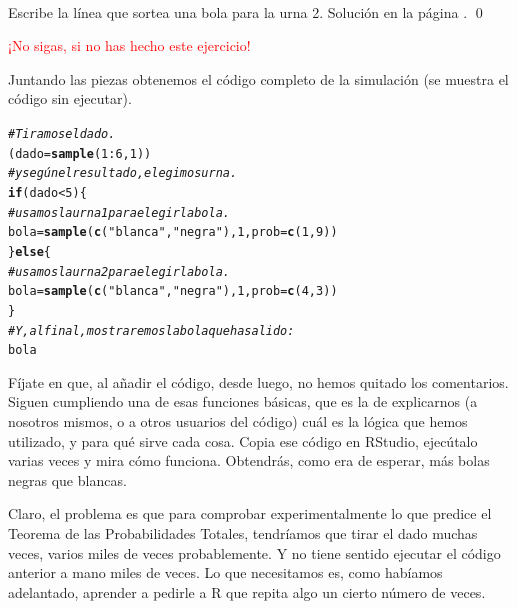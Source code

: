 \documentclass[10pt,a4paper]{article}\usepackage[]{graphicx}\usepackage[]{color}
\makeatletter
\newcommand{\hlnum}[1]{\textcolor[rgb]{0.686,0.059,0.569}{#1}}%
\newcommand{\hlstr}[1]{\textcolor[rgb]{0.192,0.494,0.8}{#1}}%
\newcommand{\hlcom}[1]{\textcolor[rgb]{0.678,0.584,0.686}{\textit{#1}}}%
\newcommand{\hlopt}[1]{\textcolor[rgb]{0,0,0}{#1}}%
\newcommand{\hlstd}[1]{\textcolor[rgb]{0.345,0.345,0.345}{#1}}%
\newcommand{\hlkwa}[1]{\textcolor[rgb]{0.161,0.373,0.58}{\textbf{#1}}}%
\newcommand{\hlkwb}[1]{\textcolor[rgb]{0.69,0.353,0.396}{#1}}%
\newcommand{\hlkwc}[1]{\textcolor[rgb]{0.333,0.667,0.333}{#1}}%
\newcommand{\hlkwd}[1]{\textcolor[rgb]{0.737,0.353,0.396}{\textbf{#1}}}%
\newenvironment{kframe}{%
 \def\at@end@of@kframe{}%
 \ifinner\ifhmode%
  \def\at@end@of@kframe{\end{minipage}}%
  \begin{minipage}{\columnwidth}%
 \fi\fi%
 \def\FrameCommand##1{\hskip\@totalleftmargin \hskip-\fboxsep
 \colorbox{shadecolor}{##1}\hskip-\fboxsep
     \hskip-\linewidth \hskip-\@totalleftmargin \hskip\columnwidth}%
 \MakeFramed {\advance\hsize-\width
   \@totalleftmargin\z@ \linewidth\hsize
   \@setminipage}}%
 {\par\unskip\endMakeFramed%
 \at@end@of@kframe}
\newenvironment{knitrout}{}{} %
\makeatother
\begin{document}
\begin{ejercicio}
\label{tut04:ejercicio08}
\quad\\
Escribe la línea que sortea una bola para la urna 2.
Solución en la página \pageref{tut04:ejercicio08:sol}.
\qed
\end{ejercicio}

\vspace{3cm}

\textcolor{red}{\Huge ¡No sigas, si no has hecho este ejercicio!}

\newpage
Juntando las piezas obtenemos el código completo de la simulación (se muestra el código sin ejecutar).

\begin{knitrout}
\color{fgcolor}\begin{kframe}
\begin{alltt}
\hlcom{# Tiramos el dado.}
\hlstd{(dado} \hlkwb{=} \hlkwd{sample}\hlstd{(}\hlnum{1}\hlopt{:}\hlnum{6}\hlstd{,}\hlnum{1}\hlstd{))}
\hlcom{# y según el resultado, elegimos urna.}
\hlkwa{if}\hlstd{(dado} \hlopt{<} \hlnum{5}\hlstd{)\{}
  \hlcom{# usamos la urna 1 para elegir la bola.}
  \hlstd{bola} \hlkwb{=} \hlkwd{sample}\hlstd{(} \hlkwd{c}\hlstd{(}\hlstr{"blanca"}\hlstd{,}\hlstr{"negra"}\hlstd{),} \hlnum{1}\hlstd{,} \hlkwc{prob}\hlstd{=}\hlkwd{c}\hlstd{(}\hlnum{1}\hlstd{,}\hlnum{9}\hlstd{) )}
\hlstd{\}} \hlkwa{else} \hlstd{\{}
  \hlcom{# usamos la urna 2 para elegir la bola.}
  \hlstd{bola} \hlkwb{=} \hlkwd{sample}\hlstd{(} \hlkwd{c}\hlstd{(}\hlstr{"blanca"}\hlstd{,}\hlstr{"negra"}\hlstd{),} \hlnum{1}\hlstd{,} \hlkwc{prob}\hlstd{=}\hlkwd{c}\hlstd{(}\hlnum{4}\hlstd{,}\hlnum{3}\hlstd{) )}
\hlstd{\}}
\hlcom{# Y, al final, mostraremos la bola que ha salido:}
\hlstd{bola}
\end{alltt}
\end{kframe}
\end{knitrout}

Fíjate en que, al añadir el código, desde luego, no hemos quitado los comentarios. Siguen cumpliendo una de esas funciones básicas, que es la de explicarnos (a nosotros mismos, o a otros usuarios del código) cuál es la lógica que hemos utilizado, y para qué sirve cada cosa. Copia ese código en RStudio, ejecútalo varias veces y mira cómo funciona. Obtendrás, como era de esperar, más bolas negras que blancas.

Claro, el problema es que para comprobar experimentalmente lo que predice el Teorema de las Probabilidades Totales, tendríamos que tirar el dado muchas veces, varios miles de veces probablemente. Y no tiene sentido ejecutar el código anterior a mano miles de veces. Lo que necesitamos es, como habíamos adelantado, aprender a pedirle a R que repita algo un cierto número de veces.
\end{document}
